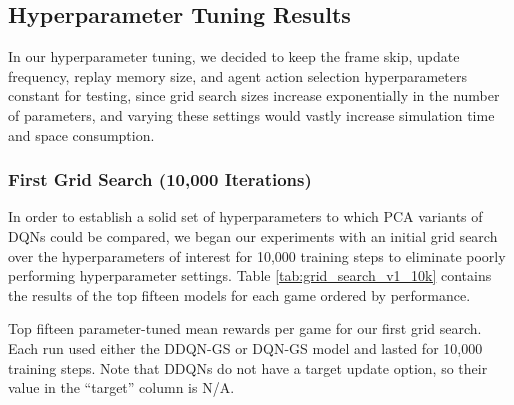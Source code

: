 \documentclass[11pt]{article}
\newcommand{\cp}{\texttt{CartPole}}
\begin{document}



\subsection{Hyperparameter Tuning Results}

In our hyperparameter tuning, we decided to keep the frame skip, update frequency, replay memory size, and agent action selection hyperparameters constant for testing, since grid search sizes increase exponentially in the number of parameters, and varying these settings would vastly increase simulation time and space consumption. 

\subsubsection{First Grid Search (10,000 Iterations)}

In order to establish a solid set of hyperparameters to which PCA variants of DQNs could be compared, we began our experiments with an initial grid search over the hyperparameters of interest for 10,000 training steps to eliminate poorly performing hyperparameter settings. Table \ref{tab:grid_search_v1_10k} contains the results of the top fifteen models for each game ordered by performance.

\begin{table}[!ht]
    \footnotesize
    \centering
    
    
    \caption{Top fifteen parameter-tuned mean rewards per game for our first grid search. Each run used either the DDQN-GS or DQN-GS model and lasted for 10,000 training steps. Note that DDQNs do not have a target update option, so their value in the ``target'' column is N/A.}
    \label{tab:grid_search_v1_10k}
\end{table}
\end{document}
